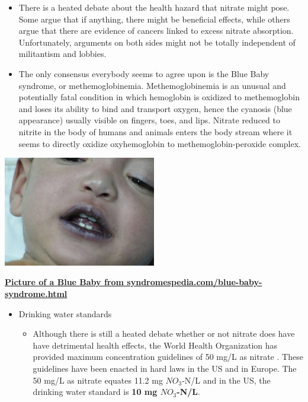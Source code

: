 \documentclass[]{book}
\providecommand{\tightlist}{%
  \setlength{\itemsep}{0pt}\setlength{\parskip}{0pt}}
\theoremstyle{definition}
\theoremstyle{definition}
\theoremstyle{definition}
\theoremstyle{remark}
\begin{document}
\begin{itemize}
  \begin{itemize}
  \tightlist
  \item
    There is a heated debate about the health hazard that nitrate might
    pose. Some argue that if anything, there might be beneficial
    effects, while others argue that there are evidence of cancers
    linked to excess nitrate absorption. Unfortunately, arguments on
    both sides might not be totally independent of militantism and
    lobbies.
  \item
    The only consensus everybody seems to agree upon is the Blue Baby
    syndrome, or methemoglobinemia. Methemoglobinemia is an unusual and
    potentially fatal condition in which hemoglobin is oxidized to
    methemoglobin and loses its ability to bind and transport oxygen,
    hence the cyanosis (blue appearance) usually visible on fingers,
    toes, and lips. Nitrate reduced to nitrite in the body of humans and
    animals enters the body stream where it seems to directly oxidize
    oxyhemoglobin to methemoglobin-peroxide complex.
  \end{itemize}
\end{itemize}

\href{https://syndromespedia.com/blue-baby-syndrome.html}{\includegraphics[width=0.50000\textwidth]{pictures/BLUE-BABY-SYNDROME.jpg}}

\href{https://syndromespedia.com/blue-baby-syndrome.html}{\textbf{Picture
of a Blue Baby from syndromespedia.com/blue-baby-syndrome.html}}

\begin{itemize}
\tightlist
\item
  Drinking water standards

  \begin{itemize}
  \tightlist
  \item
    Although there is still a heated debate whether or not nitrate does
    have have detrimental health effects, the World Health Organization
    has provided maximum concentration guidelines of 50 mg/L as nitrate
    \citep{World_Health_Organization2011-hd}. These guidelines have been
    enacted in hard laws in the US and in Europe. The 50 mg/L as nitrate
    equates 11.2 mg \(NO_3\)-N/L and in the US, the drinking water
    standard is \textbf{10 mg \(NO_3\)-N/L}.
  \end{itemize}
\end{itemize}
\end{document}
